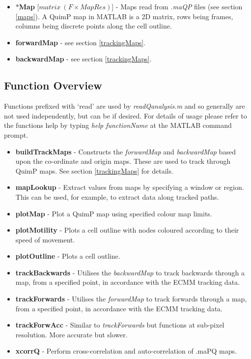 \documentclass[a4paper,12pt]{article}
\begin{document}
\begin{itemize}
   \item \textbf{$\ast$Map} [$matrix~(F\times MapRes)$] - Maps read from \textit{.maQP} files (see section \ref{maps}).  A QuimP map 
   in MATLAB is a 2D matrix, rows being frames, columns being discrete points along the cell outline.

  \item \textbf{forwardMap} - see section \ref{trackingMaps}.
  
  \item \textbf{backwardMap} - see section \ref{trackingMaps}.
     
\end{itemize}


\subsection{Function Overview}

Functions prefixed with `read'  are used by \textit{readQanalysis.m} and so generally are not used
independently, but can be if desired.    For details of usage please refer to the
functions help by typing \textit{help functionName} at the MATLAB command prompt.

\begin{itemize}

 \item \textbf{buildTrackMaps} - Constructs the \textit{forwardMap} and \textit{backwardMap} based 
 upon the co-ordinate and origin maps.  These are used to track through QuimP maps.  See section \ref{trackingMaps} for details.
 
 \item \textbf{mapLookup} - Extract values from maps by specifying a window or region.  This can be used, for example, to extract data
 along tracked paths.
 
 \item \textbf{plotMap} - Plot a QuimP map using specified colour map limits.
 
 \item \textbf{plotMotility} - Plots a cell outline with nodes coloured according to their speed of movement.
 
 \item \textbf{plotOutline} - Plots a cell outline.
 
 \item \textbf{trackBackwards} - Utilises the \textit{backwardMap} to track backwards through a map, from a specified point,
 in accordance with the ECMM tracking data. 
 
 \item \textbf{trackForwards} - Utilises the \textit{forwardMap} to track forwards through a map, from a specified point,
 in accordance with the ECMM tracking data.
 
  \item \textbf{trackForwAcc} - Similar to \textit{trackForwards} but functions at sub-pixel resolution. More accurate but slower.
   
 \item \textbf{xcorrQ} - Perform cross-correlation and auto-correlation of .maPQ maps.
 
 \end{itemize}
\end{document}
